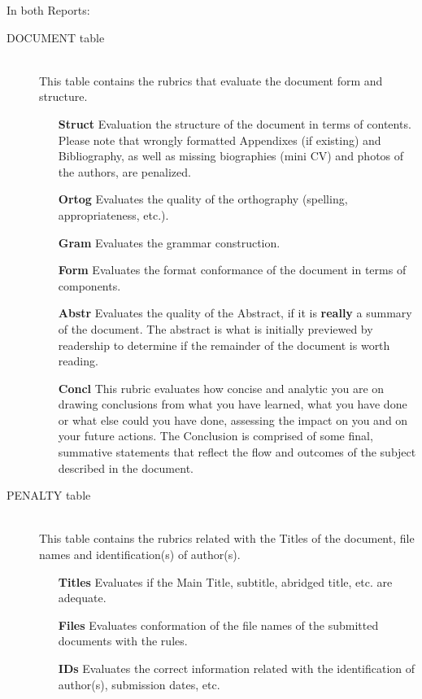 \documentclass[a4paper,12pt,journal,twoside,compsoc]{PPIEEEtran}
\begin{document}
In both Reports:
\begin{description}
\item[DOCUMENT table] \hfill \\
This table contains the rubrics that evaluate the document form and structure.
\begin{itemize}
\item[\textbf{Struct}] Evaluation the structure of the document in terms of contents. Please note that wrongly formatted Appendixes (if existing) and Bibliography, as well as missing biographies (mini CV) and photos of the authors, are penalized.
\item[\textbf{Ortog}] Evaluates the quality of the orthography (spelling, appropriateness, etc.).
\item[\textbf{Gram}] Evaluates the grammar construction.
\item[\textbf{Form}] Evaluates the format conformance of the document in terms of components.
\item[\textbf{Abstr}] Evaluates the quality of the Abstract, if it is \textbf{really} a summary of the document. The abstract is what is initially previewed by readership to determine if the remainder of the document is worth reading. 
\item[\textbf{Concl}] This rubric evaluates how concise and analytic you are on drawing conclusions from what you have learned, what you have done or what else could you have done, assessing the impact on you and on your future actions. The Conclusion is comprised of some final, summative statements that reflect the flow and outcomes of the subject described in the document. 
\end{itemize}
\item[PENALTY table] \hfill \\
This table contains the rubrics related with the Titles of the document, file names and identification(s) of  author(s).
\begin{itemize}
\item[\textbf{Titles}] Evaluates if the Main Title, subtitle, abridged title, etc. are adequate.
\item[\textbf{Files}] Evaluates conformation of the file names of the submitted documents with the rules.
\item[\textbf{IDs}] Evaluates the correct information related with the identification of author(s), submission dates, etc.
\end{itemize}
\end{description}
\end{document}

